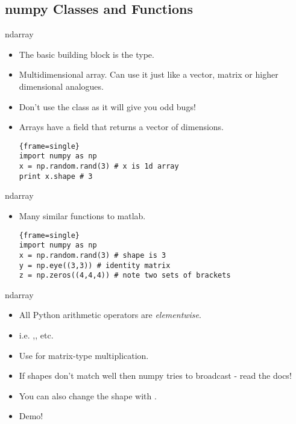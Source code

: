 \documentclass{beamer}
\begin{document}
{\subsection{numpy Classes and Functions}
\begin{frame}[fragile]{ndarray}
\begin{itemize}
\item The basic building block is the  type.
\pause
\item Multidimensional array. Can use it just like a vector, matrix or higher dimensional analogues.
\pause
\item Don't use the  class as it will give you odd bugs!
\pause
\item Arrays have a  field that returns a vector of dimensions.
\begin{block}{}
\begin{lstlisting}{frame=single}
import numpy as np
x = np.random.rand(3) # x is 1d array 
print x.shape # 3
\end{lstlisting}
\end{block}
\end{itemize}
\end{frame}

\begin{frame}[fragile]{ndarray}
\begin{itemize}
\item Many similar functions to matlab.
\begin{block}{}
\begin{lstlisting}{frame=single}
import numpy as np
x = np.random.rand(3) # shape is 3
y = np.eye((3,3)) # identity matrix
z = np.zeros((4,4,4)) # note two sets of brackets
\end{lstlisting}
\end{block}
\end{itemize}
\end{frame}

\begin{frame}[fragile]{ndarray}
\begin{itemize}
\item All Python arithmetic operators are {\em elementwise}.
\item i.e. \snippet{*},\snippet{+},\snippet{**} etc.
\pause
\item Use  for matrix-type multiplication.
\pause
\item If shapes don't match well then numpy tries to broadcast - read the docs!
\pause
\item You can also change the shape with .
\pause
\item Demo!
\end{itemize}
\end{frame}



}
\end{document}
